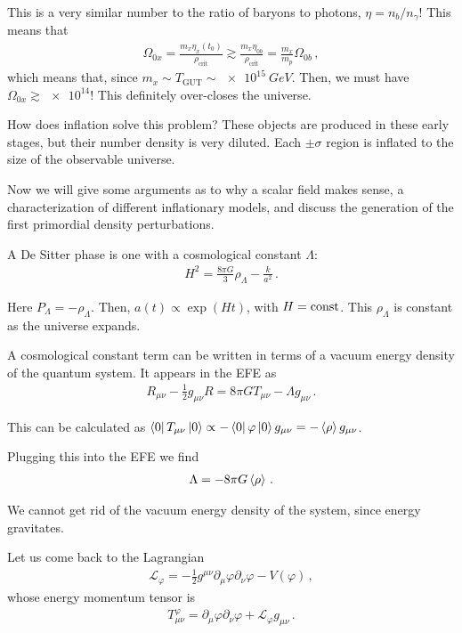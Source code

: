 \documentclass[main.tex]{subfiles}
\begin{document}
This is a very similar number to the ratio of baryons to photons, \(\eta = n_b / n_\gamma \)! 
This means that 
%
\begin{align}
\Omega_{0x} = \frac{m_x \eta _x(t_0 )}{\rho _{\text{crit}}}
\gtrsim \frac{m_x \eta_{0b}}{\rho _{\text{crit}}} = \frac{m_x}{m_p}  \Omega_{0b}
\,,
\end{align}
%
which means that, since \(m_x \sim T _{\text{GUT}} \sim \SI{e15}{GeV}\). 
Then, we must have \(\Omega_{0x} \gtrsim \num{e14}\)! This definitely over-closes the universe.

How does inflation solve this problem? These objects are produced in these early stages, but their number density is very diluted. 
Each \(\pm \sigma \) region is inflated to the size of the observable universe. 

Now we will give some arguments as to why a scalar field makes sense, a characterization of different inflationary models, and discuss the generation of the first primordial density perturbations. 

A De Sitter phase is one with a cosmological constant \(\Lambda \): 
%
\begin{align}
H^2= \frac{8 \pi G}{3} \rho _\Lambda - \frac{k}{a^2}
\,.
\end{align}
 
Here \(P_\Lambda = - \rho _\Lambda \). 
Then, \(a(t) \propto \exp(Ht)\), with \(H = \text{const}\). This \(\rho _\Lambda\) is constant as the universe expands. 

A cosmological constant term can be written in terms of a vacuum energy density of the quantum system. It appears in the EFE as 
%
\begin{align}
R_{\mu \nu } - \frac{1}{2} g_{\mu \nu } R = 8 \pi G T_{\mu \nu } - \Lambda g_{\mu \nu }
\,.
\end{align}

This can be calculated as \(\bra{0} T_{\mu \nu } \ket{0} \propto
 - \bra{0} \varphi \ket{0} g_{\mu \nu }= - \expval{\rho } g_{\mu \nu }\). 
 
Plugging this into the EFE we find 
%
\begin{align}
\Lambda = - 8 \pi G \expval{\rho }
\,.
\end{align}

We cannot get rid of the vacuum energy density of the system, since energy gravitates. 

Let us come back to the Lagrangian 
%
\begin{align}
\mathscr{L}_{\varphi } = - \frac{1}{2} g^{\mu \nu } \partial_{\mu } \varphi \partial_{\nu } \varphi - V(\varphi )
\,,
\end{align}
%
whose energy momentum tensor is 
%
\begin{align}
T^{\varphi }_{\mu \nu } = \partial_{\mu } \varphi \partial_{\nu } \varphi + \mathscr{L}_{\varphi } g_{\mu \nu }
\,.
\end{align}
\end{document}
